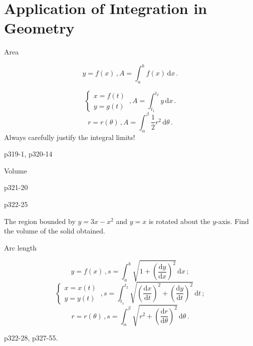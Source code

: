 \section[AppofInt1]{Application of Integration in Geometry}
\begin{frame}{Area}


\[
y=f\left(x\right)\,,A=\int_{a}^{b}f\left(x\right)\,\mathrm{d}x\,.
\]



\[
\begin{cases}
x=f\left(t\right)\\
y=g\left(t\right)
\end{cases}\,,A=\int_{t_{1}}^{t_{2}}y\,\mathrm{d}x\,.
\]
\[
r=r\left(\theta\right)\,,A=\int_{\alpha}^{\beta}\frac{1}{2}r^{2}\,\mathrm{d}\theta\,.
\]
Always carefully justify the integral limits!
\begin{example}
p319-1, p320-14
\end{example}

\end{frame}

\begin{frame}{Volume}

\begin{example}
p321-20
\end{example}



\begin{example}
p322-25
\end{example}



\begin{example}
The region bounded by $y=3x-x^{2}$ and $y=x$ is rotated about the
$y$-axis. Find the volume of the solid obtained.
\end{example}

\end{frame}

\begin{frame}{Arc length}


\[
y=f\left(x\right)\,,s=\int_{a}^{b}\sqrt{1+\left(\frac{\mathrm{d}y}{\mathrm{d}x}\right)^{2}}\,\mathrm{d}x\,;
\]
\[
\begin{cases}
x=x\left(t\right)\\
y=y\left(t\right)
\end{cases}\,,s=\int_{t_{1}}^{t_{2}}\sqrt{\left(\frac{\mathrm{d}x}{\mathrm{d}t}\right)^{2}+\left(\frac{\mathrm{d}y}{\mathrm{d}t}\right)^{2}}\,\mathrm{d}t\,;
\]
\[
r=r\left(\theta\right)\,,s=\int_{\alpha}^{\beta}\sqrt{r^{2}+\left(\frac{\mathrm{d}r}{\mathrm{d}\theta}\right)^{2}}\,\mathrm{d}\theta\,.
\]

\begin{example}
p322-28, p327-55.
\end{example}

\end{frame}

